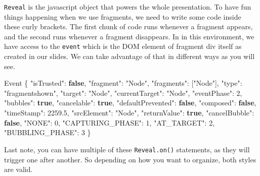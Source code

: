\documentclass[
  letterpaper,
  DIV=11,
  numbers=noendperiod]{scrreprt}
\newenvironment{Shaded}{\begin{snugshade}}{\end{snugshade}}
\newcommand{\BuiltInTok}[1]{\textcolor[rgb]{0.00,0.23,0.31}{#1}}
\newcommand{\DecValTok}[1]{\textcolor[rgb]{0.68,0.00,0.00}{#1}}
\newcommand{\FloatTok}[1]{\textcolor[rgb]{0.68,0.00,0.00}{#1}}
\newcommand{\KeywordTok}[1]{\textcolor[rgb]{0.00,0.23,0.31}{\textbf{#1}}}
\newcommand{\NormalTok}[1]{\textcolor[rgb]{0.00,0.23,0.31}{#1}}
\newcommand{\OperatorTok}[1]{\textcolor[rgb]{0.37,0.37,0.37}{#1}}
\newcommand{\StringTok}[1]{\textcolor[rgb]{0.13,0.47,0.30}{#1}}
\begin{document}
\texttt{Reveal} is the javascript object that powers the whole
presentation. To have fun things happening when we use fragments, we
need to write some code inside these curly brackets. The first chunk of
code runs whenever a fragment appears, and the second runs whenever a
fragment disappears. In in this environment, we have access to the
\texttt{event} which is the DOM element of fragment div itself as
created in our slides. We can take advantage of that in different ways
as you will see.

\begin{Shaded}
\begin{Highlighting}[]
\BuiltInTok{Event}\NormalTok{ \{}
  \StringTok{"isTrusted"}\OperatorTok{:} \KeywordTok{false}\OperatorTok{,}
  \StringTok{"fragment"}\OperatorTok{:} \StringTok{"Node"}\OperatorTok{,}
  \StringTok{"fragments"}\OperatorTok{:}\NormalTok{ [}\StringTok{"Node"}\NormalTok{]}\OperatorTok{,}
  \StringTok{"type"}\OperatorTok{:} \StringTok{"fragmentshown"}\OperatorTok{,}
  \StringTok{"target"}\OperatorTok{:} \StringTok{"Node"}\OperatorTok{,}
  \StringTok{"currentTarget"}\OperatorTok{:} \StringTok{"Node"}\OperatorTok{,}
  \StringTok{"eventPhase"}\OperatorTok{:} \DecValTok{2}\OperatorTok{,}
  \StringTok{"bubbles"}\OperatorTok{:} \KeywordTok{true}\OperatorTok{,}
  \StringTok{"cancelable"}\OperatorTok{:} \KeywordTok{true}\OperatorTok{,}
  \StringTok{"defaultPrevented"}\OperatorTok{:} \KeywordTok{false}\OperatorTok{,}
  \StringTok{"composed"}\OperatorTok{:} \KeywordTok{false}\OperatorTok{,}
  \StringTok{"timeStamp"}\OperatorTok{:} \FloatTok{2259.5}\OperatorTok{,}
  \StringTok{"srcElement"}\OperatorTok{:} \StringTok{"Node"}\OperatorTok{,}
  \StringTok{"returnValue"}\OperatorTok{:} \KeywordTok{true}\OperatorTok{,}
  \StringTok{"cancelBubble"}\OperatorTok{:} \KeywordTok{false}\OperatorTok{,}
  \StringTok{"NONE"}\OperatorTok{:} \DecValTok{0}\OperatorTok{,}
  \StringTok{"CAPTURING\_PHASE"}\OperatorTok{:} \DecValTok{1}\OperatorTok{,}
  \StringTok{"AT\_TARGET"}\OperatorTok{:} \DecValTok{2}\OperatorTok{,}
  \StringTok{"BUBBLING\_PHASE"}\OperatorTok{:} \DecValTok{3}
\NormalTok{\}}
\end{Highlighting}
\end{Shaded}

Last note, you can have multiple of these \texttt{Reveal.on()}
statements, as they will trigger one after another. So depending on how
you want to organize, both styles are valid.
\end{document}
